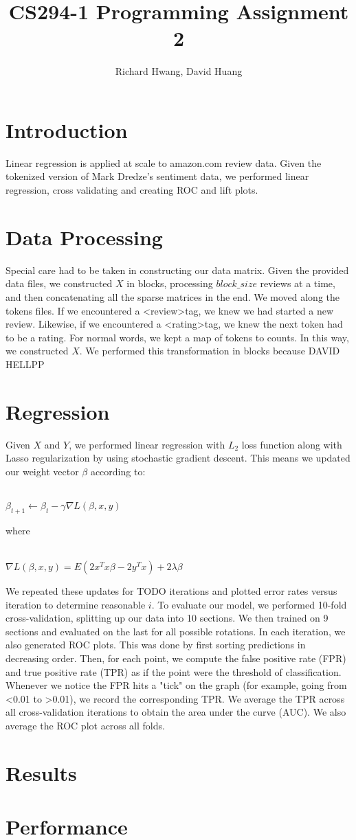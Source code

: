 \documentclass[11pt]{article}
\title{CS294-1 Programming Assignment 2}
\author{Richard Hwang, David Huang}
\begin{document}
\maketitle

\section{Introduction}
Linear regression is applied at scale to amazon.com review data.  Given the tokenized version of Mark Dredze's sentiment data, we performed linear regression, cross validating and creating ROC and lift plots.

\section{Data Processing}
Special care had to be taken in constructing our data matrix.  Given the provided data files, we constructed $X$ in blocks, processing $block\_size$ reviews at a time, and then concatenating all the sparse matrices in the end.  We moved along the tokens files.  If we encountered a \textless review\textgreater tag, we knew we had started a new review.  Likewise, if we encountered a \textless rating\textgreater tag, we knew the next token had to be a rating.  For normal words, we kept a map of tokens to counts.  In this way, we constructed $X$.  We performed this transformation in blocks because DAVID HELLPP

\section{Regression}
Given $X$ and $Y$, we performed linear regression with $L_2$ loss function along with Lasso regularization by using stochastic gradient descent.  This means we updated our weight vector $\beta$ according to:\\\\
\centerline{$\beta_{t+1} \leftarrow \beta_{t} - \gamma \nabla L(\beta, x, y)$}
where\\\\
\centerline{$\nabla L(\beta, x, y) = E(2x^T x \beta - 2 y^T x) + 2 \lambda \beta$}
We repeated these updates for TODO iterations and plotted error rates versus iteration to determine reasonable $i$.  To evaluate our model, we performed 10-fold cross-validation, splitting up our data into 10 sections.  We then trained on 9 sections and evaluated on the last for all possible rotations.  In each iteration, we also generated ROC plots.  This was done by first sorting predictions in decreasing order.  Then, for each point, we compute the false positive rate (FPR) and true positive rate (TPR) as if the point were the threshold of classification.  Whenever we notice the FPR hits a "tick" on the graph (for example, going from <0.01 to >0.01), we record the corresponding TPR.  We average the TPR across all cross-validation iterations to obtain the area under the curve (AUC).    We also average the ROC plot across all folds.  

\section{Results}


\section{Performance}
\end{document}

